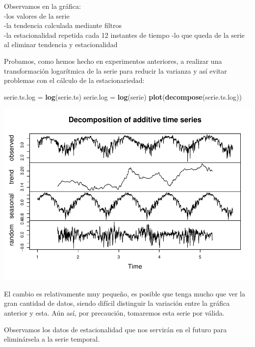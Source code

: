 \documentclass[]{article}
\newenvironment{Shaded}{\begin{snugshade}}{\end{snugshade}}
\newcommand{\KeywordTok}[1]{\textcolor[rgb]{0.13,0.29,0.53}{\textbf{#1}}}
\newcommand{\StringTok}[1]{\textcolor[rgb]{0.31,0.60,0.02}{#1}}
\newcommand{\OperatorTok}[1]{\textcolor[rgb]{0.81,0.36,0.00}{\textbf{#1}}}
\newcommand{\NormalTok}[1]{#1}
\begin{document}
Observamos en la gráfica:\\
-los valores de la serie\\
-la tendencia calculada mediante filtros\\
-la estacionalidad repetida cada 12 instantes de tiempo -lo que queda de
la serie al eliminar tendencia y estacionalidad

Probamos, como hemos hecho en experimentos anteriores, a realizar una
transformación logarítmica de la serie para reducir la varianza y así
evitar problemas con el cálculo de la estacionariedad:

\begin{Shaded}
\begin{Highlighting}[]
\NormalTok{serie.ts.log =}\StringTok{ }\KeywordTok{log}\NormalTok{(serie.ts) }
\NormalTok{serie.log =}\StringTok{ }\KeywordTok{log}\NormalTok{(serie) }
\KeywordTok{plot}\NormalTok{(}\KeywordTok{decompose}\NormalTok{(serie.ts.log))}
\end{Highlighting}
\end{Shaded}

\includegraphics{exercise2_files/figure-latex/unnamed-chunk-6-1.pdf}

El cambio es relativamente muy pequeño, es posible que tenga mucho que
ver la gran cantidad de datos, siendo difícil distinguir la variación
entre la gráfica anterior y esta. Aún así, por precaución, tomaremos
esta serie por válida.

Observamos los datos de estacionalidad que nos servirán en el futuro
para eliminársela a la serie temporal.

\begin{Shaded}
\end{Shaded}
\end{document}
